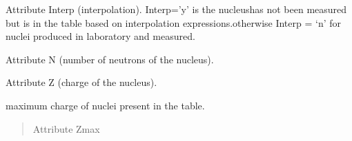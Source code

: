 \documentclass[letterpaper,10pt,english]{sphinxmanual}
\begin{document}
\begin{fulllineitems}

\begin{fulllineitems}
\label{\detokenize{source/api/setup_masses:nucleardatapy.setup_masses.SetupMasses.Interp}}
\pysigstartsignatures
{}
\pysigstopsignatures
\sphinxAtStartPar
Attribute Interp (interpolation). Interp=’y’ is the nucleushas not been measured but is in the table based on interpolation expressions.otherwise Interp = ‘n’ for nuclei produced in laboratory and measured.

\end{fulllineitems}


\begin{fulllineitems}
\label{\detokenize{source/api/setup_masses:nucleardatapy.setup_masses.SetupMasses.N}}
\pysigstartsignatures
{}
\pysigstopsignatures
\sphinxAtStartPar
Attribute N (number of neutrons of the nucleus).

\end{fulllineitems}


\begin{fulllineitems}
\label{\detokenize{source/api/setup_masses:nucleardatapy.setup_masses.SetupMasses.Z}}
\pysigstartsignatures
{}
\pysigstopsignatures
\sphinxAtStartPar
Attribute Z (charge of the nucleus).

\end{fulllineitems}


\begin{fulllineitems}
\label{\detokenize{source/api/setup_masses:nucleardatapy.setup_masses.SetupMasses.Zmax}}
\pysigstartsignatures
{}
\pysigstopsignatures
\sphinxAtStartPar
maximum charge of nuclei present in the table.
\begin{quote}\begin{description}
\sphinxAtStartPar
Attribute Zmax


\end{description}
\end{quote}
\end{fulllineitems}
\end{fulllineitems}
\end{document}
